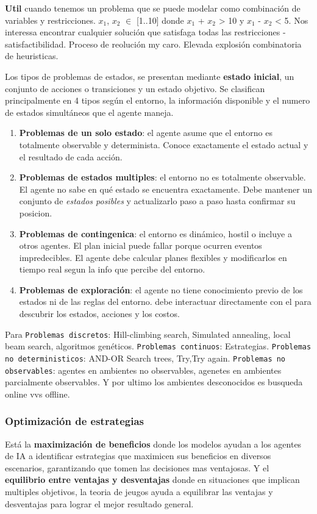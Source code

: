 \textbf{Util} cuando tenemos un problema que se puede modelar como combinación de variables y restricciones.
$x_1$, $x_2$ $\in$ [1..10] donde $x_1$ + $x_2$ > 10 y  $x_1$ - $x_2$ < 5.
Nos interessa encontrar cualquier solución que satisfaga todas las restricciones - satisfactibilidad. Proceso de reolución my caro. Elevada explosión combinatoria de heuristicas.


Los tipos de problemas de estados, se presentan mediante \textbf{estado inicial}, un conjunto de acciones o transiciones y un estado objetivo. Se clasifican principalmente en 4 tipos según el entorno, la información disponible
y el numero de estados simultáneos que el agente maneja.
\begin{enumerate}
    \item \textbf{Problemas de un solo estado}: el agente asume que el entorno es totalmente observable y determinista. Conoce exactamente el estado actual y el resultado de cada acción.
    \item \textbf{Problemas de estados multiples}: el entorno no es totalmente observable. El agente no sabe en qué estado se encuentra exactamente. Debe mantener un conjunto de \textit{estados posibles} y actualizarlo paso a paso hasta confirmar su posicion.
    \item \textbf{Problemas de contingenica}: el entorno es dinámico, hostil o incluye a otros agentes. El plan inicial puede fallar porque ocurren eventos impredecibles. El agente debe calcular planes flexibles y modificarlos en tiempo real segun la info que percibe del entorno.
    \item \textbf{Problemas de exploración}: el agente no tiene conocimiento previo de los estados ni de las reglas del entorno. debe interactuar directamente con el para descubrir los estados, acciones y los costos.
\end{enumerate}

Para \texttt{Problemas discretos}: Hill-climbing search, Simulated annealing, local beam search, algoritmos genéticos. \texttt{Problemas continuos}: Estrategias. \texttt{Problemas no deterministicos}: AND-OR Search trees, Try,Try again. 
\texttt{Problemas no observables}: agentes en ambientes no observables, agenetes en ambientes parcialmente observables. Y por ultimo los ambientes desconocidos es busqueda online vvs offline.

\subsubsection{Optimización de estrategias}
Está la \textbf{maximización de beneficios} donde los modelos ayudan a los agentes de IA a identificar estrategias que maximicen sus beneficios en diversos escenarios, garantizando que tomen las decisiones mas ventajosas.
Y el \textbf{equilibrio entre ventajas y desventajas} donde en situaciones que implican multiples objetivos, la teoria de jeugos ayuda a equilibrar las ventajas y desventajas para lograr el mejor resultado general.

